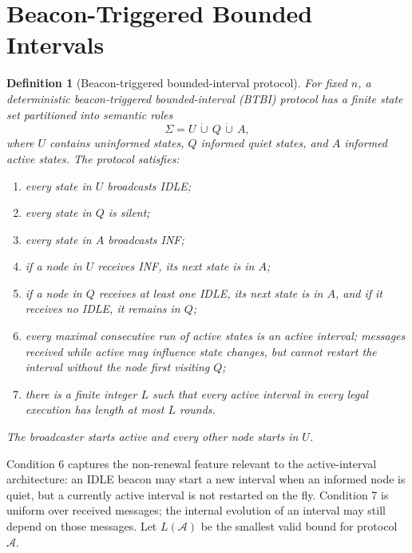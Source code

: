 \documentclass[11pt]{article}
\newtheorem{definition}{Definition}
\begin{document}
\section{Beacon-Triggered Bounded Intervals}
\begin{definition}[Beacon-triggered bounded-interval protocol]
For fixed $n$, a deterministic beacon-triggered bounded-interval (BTBI) protocol has a finite state set partitioned into semantic roles
\[
\Sigma=U\,\dot\cup\,Q\,\dot\cup\,A,
\]
where $U$ contains uninformed states, $Q$ informed quiet states, and $A$ informed active states. The protocol satisfies:
\begin{enumerate}[label=\arabic*.]
\item every state in $U$ broadcasts IDLE;
\item every state in $Q$ is silent;
\item every state in $A$ broadcasts INF;
\item if a node in $U$ receives INF, its next state is in $A$;
\item if a node in $Q$ receives at least one IDLE, its next state is in $A$, and if it receives no IDLE, it remains in $Q$;
\item every maximal consecutive run of active states is an active interval; messages received while active may influence state changes, but cannot restart the interval without the node first visiting $Q$;
\item there is a finite integer $L$ such that every active interval in every legal execution has length at most $L$ rounds.
\end{enumerate}
The broadcaster starts active and every other node starts in $U$.
\end{definition}

Condition 6 captures the non-renewal feature relevant to the active-interval architecture: an IDLE beacon may start a new interval when an informed node is quiet, but a currently active interval is not restarted on the fly. Condition 7 is uniform over received messages; the internal evolution of an interval may still depend on those messages. Let $L(\mathcal A)$ be the smallest valid bound for protocol $\mathcal A$.
\end{document}
